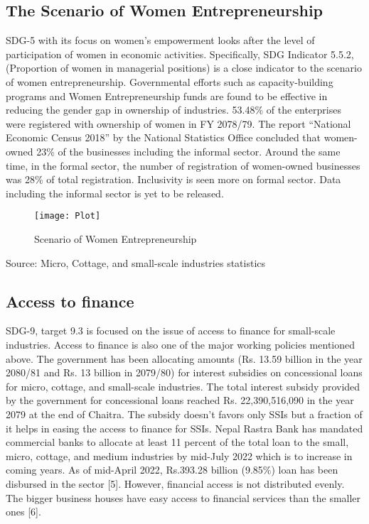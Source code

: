 \documentclass[a4paper]{article}
\begin{document}
\subsection{The Scenario of Women Entrepreneurship}
SDG-5 with its focus on women’s empowerment looks after the level of participation of women in economic activities. Specifically, SDG Indicator 5.5.2, (Proportion of women in managerial positions) is a close indicator to the scenario of women entrepreneurship.  Governmental efforts such as capacity-building programs and Women Entrepreneurship funds are found to be effective in reducing the gender gap in ownership of industries. 53.48\% of the enterprises were registered with ownership of women in FY 2078/79. The report “National Economic Census 2018” by the National Statistics Office concluded that women-owned 23\% of the businesses including the informal sector. Around the same time, in the formal sector, the number of registration of women-owned businesses was 28\% of total registration. Inclusivity is seen more on formal sector. Data including the informal sector is yet to be released.
\begin{figure}
\centering
\texttt{[image: Plot]}
\caption{Scenario of Women Entrepreneurship}
\end{figure}
Source: Micro, Cottage, and small-scale industries statistics
\subsection{Access to finance}
SDG-9, target 9.3 is focused on the issue of access to finance for small-scale industries. Access to finance is also one of the major working policies mentioned above. The government has been allocating amounts (Rs. 13.59 billion in the year 2080/81 and Rs. 13 billion in 2079/80) for interest subsidies on concessional loans for micro, cottage, and small-scale industries. The total interest subsidy provided by the government for concessional loans reached Rs. 22,390,516,090 in the year 2079 at the end of Chaitra. The subsidy doesn’t favors only SSIs but a fraction of it helps in easing the access to finance for SSIs. Nepal Rastra Bank has mandated commercial banks to allocate at least 11 percent of the total loan to the small, micro, cottage, and medium industries by mid-July 2022 which is to increase in coming years. As of mid-April 2022, Rs.393.28 billion (9.85\%) loan has been disbursed in the sector [5]. However, financial access is not distributed evenly. The bigger business houses have easy access to financial services than the smaller ones [6]. 
\end{document}
